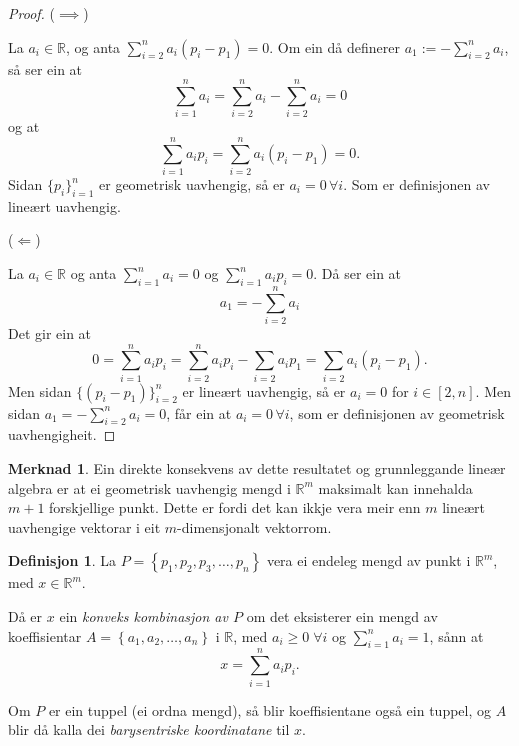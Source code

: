 \documentclass[a4paper, 12pt, norsk]{article}
\theoremstyle{plain}
\theoremstyle{definition}
\newtheorem{definition}[theorem]{Definisjon}
\newtheorem{remark}[theorem]{Merknad}
\newcommand{\Rb}{\mathbb{R}}
\newcommand{\set}[1]{ \left\{ #1 \right\} } %
\begin{document}
\begin{proof}
	($\implies$)
		
	La $a_i\in\Rb$, og anta $\sum_{i=2}^na_i(p_i-p_1)=0$. Om ein då definerer $a_1 := -\sum_{i=2}^na_i$, så ser ein at
	\begin{equation*}
		\sum_{i=1}^na_i=\sum_{i=2}^na_i-\sum_{i=2}^na_i=0
	\end{equation*}
	og at 
	\begin{equation*}
		\sum_{i=1}^na_ip_i=\sum_{i=2}^na_i(p_i-p_1)=0.
	\end{equation*}
	Sidan $\{p_i\}_{i=1}^n$ er geometrisk uavhengig, så er $a_i=0 \, \forall i$. Som er definisjonen av lineært uavhengig.
	
	(\(\Longleftarrow\))
	
	La $a_i\in\Rb$ og anta $\sum_{i=1}^n a_i=0$ og $\sum_{i=1}^n a_ip_i=0$. Då ser ein at 
	\begin{equation*}
		a_1=-\sum_{i=2}^n a_i
	\end{equation*} 
	Det gir ein at
	\begin{equation*}
		0=\sum_{i=1}^n a_ip_i=\sum_{i=2}^n a_ip_i-\sum_{i=2}a_ip_1=\sum_{i=2}a_i(p_i-p_1).
	\end{equation*}
	Men sidan $\{(p_i-p_1)\}_{i=2}^n$ er lineært uavhengig, så er $ a_i = 0$ for $i\in[2,n]$. Men sidan $a_1 = -\sum_{i=2}^n a_i=0$, får ein at $a_i=0 \, \forall i$, som er definisjonen av geometrisk uavhengigheit.
\end{proof}

\begin{remark}
	Ein direkte konsekvens av dette resultatet og grunnleggande lineær algebra er at ei geometrisk uavhengig mengd i $\Rb^m$ maksimalt kan innehalda $m+1$ forskjellige punkt. Dette er fordi det kan ikkje vera meir enn $m$ lineært uavhengige vektorar i eit $m$-dimensjonalt vektorrom.
\end{remark}

\begin{definition}
	La \( P = \set{p_1, p_2, p_3, \dots, p_n} \) vera ei endeleg mengd av punkt i \( \Rb^m \), med \( x\in\Rb^m \).

	Då er \( x \) ein \emph{konveks kombinasjon av \( P \)} om det eksisterer ein mengd av koeffisientar \( A=\set{a_1, a_2, \dots, a_n} \) i \( \Rb \), med \( a_i \geq 0 \; \forall i \) og \( \sum_{i=1}^n a_i = 1 \), sånn at
	\[
		x=\sum_{i=1}^n a_ip_i.
	\]
	
	Om $P$ er ein tuppel (ei ordna mengd), så blir koeffisientane også ein tuppel, og $A$ blir då kalla dei \emph{barysentriske koordinatane} til $x$.
\end{definition}
\end{document}
